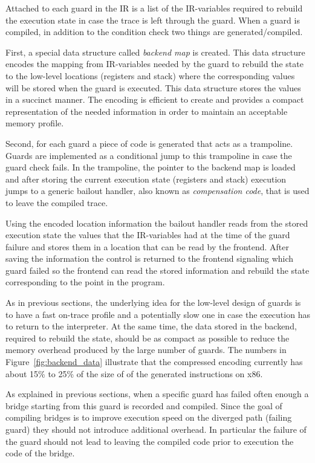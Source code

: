 \documentclass[letter,10pt]{sigplanconf}
\begin{document}
Attached to each guard in the IR is a list of the IR-variables required to
rebuild the execution state in case the trace is left through
the guard. When a guard is compiled, in addition to the
condition check two things are generated/compiled.

First, a special data
structure called \emph{backend map} is created. This data structure encodes the
mapping from IR-variables needed by the guard to rebuild the state to the
low-level locations (registers and stack) where the corresponding values will
be stored when the guard is executed.
This data
structure stores the values in a succinct manner. The encoding is efficient to create and
provides a compact representation of the needed information in order
to maintain an acceptable memory profile.

Second, for each guard a piece of code is generated that acts as a trampoline.
Guards are implemented as a conditional jump to this trampoline in case the
guard check fails.
In the trampoline, the pointer to the
backend map is loaded and after storing the current execution state
(registers and stack) execution jumps to a generic bailout handler, also known
as \emph{compensation code},
that is used to leave the compiled trace.

Using the encoded location information the bailout handler reads from the
stored execution state the values that the IR-variables had at the time of the
guard failure and stores them in a location that can be read by the frontend.
After saving the information the control is returned to the frontend signaling
which guard failed so the frontend can read the stored information and rebuild
the state corresponding to the point in the program.

As in previous sections, the underlying idea for the low-level design of guards is to have
a fast on-trace profile and a potentially slow one in case
the execution has to return to the interpreter. At the same
time, the data stored in the backend, required to rebuild the state, should be as
compact as possible to reduce the memory overhead produced by the large number
of guards. The numbers in Figure~\ref{fig:backend_data} illustrate that the
compressed encoding currently has about 15\% to 25\% of the size of of the
generated instructions on x86.

As explained in previous sections, when a specific guard has failed often enough
a bridge starting from this guard is recorded and compiled.
Since the goal of compiling bridges is to improve execution speed on the
diverged path (failing guard) they should not introduce additional overhead.
In particular the failure of the guard should not lead
to leaving the compiled code prior to execution the code of the bridge.
\end{document}
